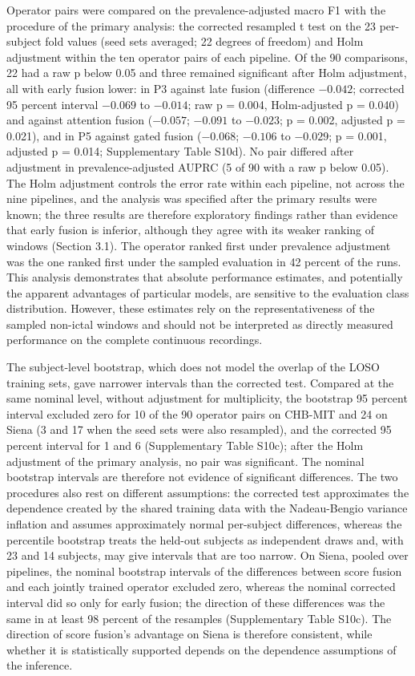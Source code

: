 \documentclass[11pt,a4paper]{article}
\begin{document}
Operator pairs were compared on the prevalence-adjusted macro F1 with the procedure of
the primary analysis: the corrected resampled t test on the 23 per-subject fold values
(seed sets averaged; 22 degrees of freedom) and Holm adjustment within the ten operator
pairs of each pipeline. Of the 90 comparisons, 22 had a raw p below 0.05 and three
remained significant after Holm adjustment, all with early fusion lower: in P3 against
late fusion (difference \(-0.042\); corrected 95 percent interval \(-0.069\) to \(-0.014\); raw
p = 0.004, Holm-adjusted p = 0.040) and against attention fusion (\(-0.057\); \(-0.091\) to
\(-0.023\); p = 0.002, adjusted p = 0.021), and in P5 against gated fusion (\(-0.068\); \(-0.106\) to
\(-0.029\); p = 0.001, adjusted p = 0.014; Supplementary Table S10d). No pair differed after
adjustment in prevalence-adjusted AUPRC (5 of 90 with a raw p below 0.05). The Holm
adjustment controls the error rate within each pipeline, not across the nine pipelines,
and the analysis was specified after the primary results were known; the three results
are therefore exploratory findings rather than evidence that early fusion is inferior,
although they agree with its weaker ranking of windows (Section 3.1). The operator
ranked first under prevalence adjustment was the one ranked first under the sampled
evaluation in 42 percent of the runs. This analysis demonstrates that absolute performance estimates, and
potentially the apparent advantages of particular models, are sensitive to the
evaluation class distribution. However, these estimates rely on the representativeness of
the sampled non-ictal windows and should not be interpreted as directly measured
performance on the complete continuous recordings.

The subject-level bootstrap, which does not model the overlap of the LOSO training sets,
gave narrower intervals than the corrected test. Compared at the same nominal level,
without adjustment for multiplicity, the bootstrap 95 percent interval excluded zero for
10 of the 90 operator pairs on CHB-MIT and 24 on Siena (3 and 17 when the seed sets were
also resampled), and the corrected 95 percent interval for 1 and 6 (Supplementary Table
S10c); after the Holm adjustment of the primary analysis, no pair was significant. The
nominal bootstrap intervals are therefore not evidence of significant differences. The
two procedures also rest on different assumptions: the corrected test approximates the
dependence created by the shared training data with the Nadeau-Bengio variance
inflation and assumes approximately normal per-subject differences, whereas the
percentile bootstrap treats the held-out subjects as independent draws and, with 23 and
14 subjects, may give intervals that are too narrow. On Siena, pooled over pipelines, the
nominal bootstrap intervals of the differences between score fusion and each jointly
trained operator excluded zero, whereas the nominal corrected interval did so only for
early fusion; the direction of these differences was the same in at least 98 percent of
the resamples (Supplementary Table S10c). The direction of score fusion's advantage on
Siena is therefore consistent, while whether it is statistically supported depends on the
dependence assumptions of the inference.
\end{document}
